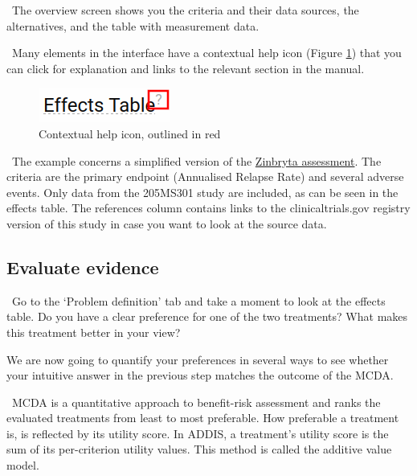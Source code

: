 \documentclass[00_mcda_tutorial.tex]{subfiles}
\begin{document}
\noindent \faGraduationCap \, The overview screen shows you the criteria and their data sources, the alternatives, and the table with measurement data.
\newline

\noindent \faLightbulbO \, Many elements in the interface have a contextual help icon (Figure \ref{fig:tooltip}) that you can click for explanation and links to the relevant section in the manual.
\newline

\begin{figure}[!h]
  \centering
  \includegraphics[width=.3\textwidth]{fig/contextHelp.png}
  \caption{Contextual help icon, outlined in red}
  \label{fig:tooltip}
\end{figure}

\noindent \faGraduationCap \, The example concerns a simplified version of the \href{https://www.ema.europa.eu/en/medicines/human/EPAR/zinbryta#authorisation-details-section}{Zinbryta assessment}. The criteria are the primary endpoint (Annualised Relapse Rate) and several adverse events. Only data from the 205MS301 study are included, as can be seen in the effects table. The references column contains links to the clinicaltrials.gov registry version of this study in case you want to look at the source data.

\subsection*{Evaluate evidence}
\leftpointright \, Go to the ‘Problem definition’ tab and take a moment to look at the effects table. Do you have a clear preference for one of the two treatments? What makes this treatment better in your view?
\newline

\noindent We are now going to quantify your preferences in several ways to see whether your intuitive answer in the previous step matches the outcome of the MCDA.
\newline

\noindent \faGraduationCap \, MCDA is a quantitative approach to benefit-risk assessment and ranks the evaluated treatments from least to most preferable. How preferable a treatment is, is reflected by its utility score. In ADDIS, a treatment’s utility score is the sum of its per-criterion utility values. This method is called the additive value model.
\newline
\end{document}
